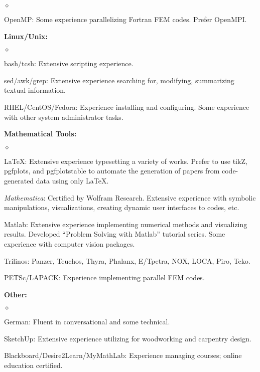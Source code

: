 \documentclass[margin,line,pifont,palatino,10pt]{res}
\begin{document}
\begin{resume}
\begin{list}{$\diamond$}{\leftmargin=0.15in}
	\item OpenMP:  Some experience parallelizing Fortran FEM codes.  Prefer OpenMPI.
\end{list}
{\bf Linux/Unix:}
\begin{list}{$\diamond$}{\leftmargin=0.15in}
	\item bash/tcsh:  Extensive scripting experience.
	\item sed/awk/grep:  Extensive experience searching for, modifying, summarizing textual information.
	\item RHEL/CentOS/Fedora:  Experience installing and configuring.  Some experience with other system administrator tasks.
\end{list}
{\bf Mathematical Tools:}
\begin{list}{$\diamond$}{\leftmargin=0.15in}
	\item \LaTeX:  Extensive experience typesetting a variety of works.  Prefer to use tikZ, pgfplots, and pgfplotstable to automate the generation of papers from code-generated data using only \LaTeX.
	\item \emph{Mathematica}:  Certified by Wolfram Research.  Extensive experience with symbolic manipulations, visualizations, creating dynamic user interfaces to codes, etc.
	\item Matlab:  Extensive experience implementing numerical methods and visualizing results.  Developed ``Problem Solving with Matlab'' tutorial series.  Some experience with computer vision packages.
	\item Trilinos:  Panzer, Teuchos, Thyra, Phalanx, E/Tpetra, NOX, LOCA, Piro, Teko.
	\item PETSc/LAPACK:  Experience implementing parallel FEM codes.
\end{list}
{\bf Other:}
\begin{list}{$\diamond$}{\leftmargin=0.15in}
	\item German:  Fluent in conversational and some technical.
	\item SketchUp:  Extensive experience utilizing for woodworking and carpentry design.
	\item Blackboard/Desire2Learn/MyMathLab:  Experience managing courses; online education certified.
\end{list}






\vspace{1.5mm}

\end{resume}
\end{document}
